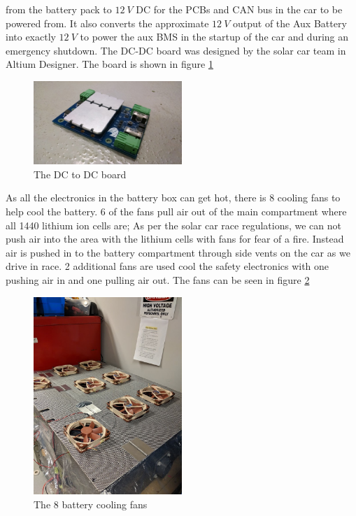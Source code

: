 \documentclass{article}
\begin{document}
    from the battery pack to $12\ V$ DC for the PCBs and CAN bus in the
    car to be powered from. It also converts the approximate $12\ V$
    output of the Aux Battery into exactly $12\ V$ to power the aux BMS
    in the startup of the car and during an emergency shutdown. The
    DC-DC board was designed by the solar car team in Altium Designer.
    The board is shown in figure \ref{fig:DCDC}
    \begin{figure}[H]
        \centering
        \includegraphics[width=0.5\textwidth]{images/dc-dc_board.jpeg}
        \caption{The DC to DC board}
        \label{fig:DCDC}
    \end{figure}
    \par As all the electronics in the battery box can get hot, there is
    8 cooling fans to help cool the battery. 6 of the fans pull air out
    of the main compartment where all 1440 lithium ion cells are; As per
    the solar car race regulations, we can not push air into the area
    with the lithium cells with fans for fear of a fire. Instead air is
    pushed in to the battery compartment through side vents on the car
    as we drive in race. 2 additional fans are used cool the safety
    electronics with one pushing air in and one pulling air out. The
    fans can be seen in figure \ref{fig:fans}
    \begin{figure}[H]
        \centering
        \includegraphics[width=0.5\textwidth]{images/fans.jpg}
        \caption{The 8 battery cooling fans}
        \label{fig:fans}
    \end{figure}
\end{document}
